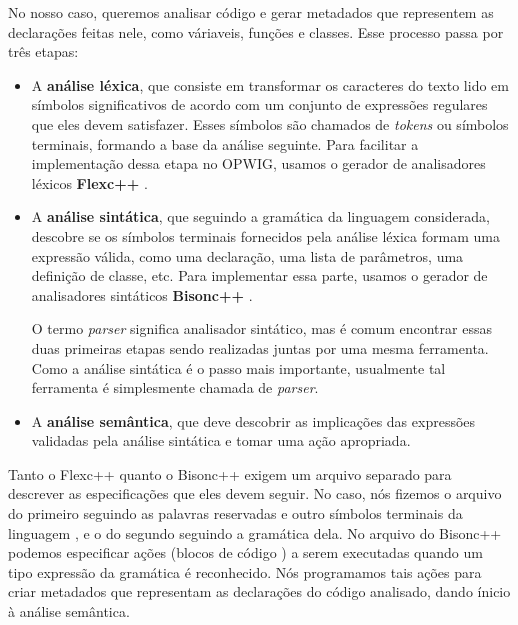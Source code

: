   No nosso caso, queremos analisar código \CXX{} e gerar metadados que representem as
  declarações feitas nele, como váriaveis, funções e classes. Esse processo passa por três etapas:
  \begin{itemize}
    \item A \textbf{análise léxica}, que consiste em transformar os caracteres do texto
      lido em símbolos 
      significativos de acordo com um conjunto de expressões regulares que eles devem satisfazer.
      Esses símbolos são chamados de \textit{tokens} ou símbolos terminais, formando a base da
      análise seguinte.
      Para facilitar a implementação dessa etapa no OPWIG, usamos o gerador de analisadores léxicos
      \textbf{Flexc++} \cite{flex:00}.
      
    \item A \textbf{análise sintática}, que seguindo a gramática da linguagem considerada, 
      descobre se os símbolos terminais fornecidos pela análise léxica formam uma expressão válida,
      como uma declaração, uma lista de parâmetros, uma definição de classe, etc.
      Para implementar essa parte, usamos o gerador de analisadores sintáticos \textbf{Bisonc++}
      \cite{bison:00}.
      
      O termo \textit{parser} significa analisador sintático, mas é comum encontrar essas duas
      primeiras etapas sendo realizadas juntas por uma mesma ferramenta. Como a análise sintática
      é o passo mais importante, usualmente tal ferramenta é simplesmente chamada de \textit{parser}.
      
    \item A \textbf{análise semântica}, que deve descobrir as implicações das expressões
      validadas pela análise sintática e tomar uma ação apropriada.
  \end{itemize}
  
  Tanto o Flexc++ quanto o Bisonc++ exigem um arquivo separado para descrever as
  especificações que eles devem seguir. No caso, nós fizemos o arquivo do primeiro
  seguindo as palavras reservadas e outro símbolos terminais da linguagem \CXX{},
  e o do segundo seguindo a gramática dela. No arquivo do Bisonc++ podemos
  especificar ações (blocos de código \CXX{}) a serem executadas quando um tipo
  expressão da gramática é reconhecido. Nós programamos tais ações para criar
  metadados que representam as declarações do código \CXX{} analisado,
  dando ínicio à análise semântica.
  

